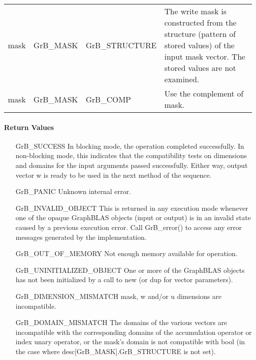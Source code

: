 \begin{itemize}[leftmargin=1.1in]
\begin{tabular}{lllp{2.7in}}
        {\sf mask} & {\sf GrB\_MASK} & {\sf GrB\_STRUCTURE}   & The write mask is
        constructed from the structure (pattern of stored values) of the input
        {\sf mask} vector. The stored values are not examined.\\

        {\sf mask} & {\sf GrB\_MASK} & {\sf GrB\_COMP}   & Use the 
        complement of {\sf mask}. \\
    \end{tabular}
\end{itemize}

\paragraph{Return Values}

\begin{itemize}[leftmargin=2.2in]
    \item[{\sf GrB\_SUCCESS}]         In blocking mode, the operation completed
    successfully. In non-blocking mode, this indicates that the compatibility 
    tests on dimensions and domains for the input arguments passed successfully. 
    Either way, output vector {\sf w} is ready to be used in the next method of 
    the sequence.

    \item[{\sf GrB\_PANIC}]           Unknown internal error.

    \item[{\sf GrB\_INVALID\_OBJECT}] This is returned in any execution mode 
    whenever one of the opaque GraphBLAS objects (input or output) is in an invalid 
    state caused by a previous execution error.  Call {\sf GrB\_error()} to access 
    any error messages generated by the implementation.

    \item[{\sf GrB\_OUT\_OF\_MEMORY}] Not enough memory available for operation.

    \item[{\sf GrB\_UNINITIALIZED\_OBJECT}] One or more of the GraphBLAS objects
    has not been initialized by a call to {\sf new} (or {\sf dup} for vector
    parameters).

    \item[{\sf GrB\_DIMENSION\_MISMATCH}]  {\sf mask}, {\sf w} and/or {\sf u}
    dimensions are incompatible.

    \item[{\sf GrB\_DOMAIN\_MISMATCH}]    The domains of the various vectors are
    incompatible with the corresponding domains of the accumulation operator
    or index unary operator, or the mask's domain is not compatible with {\sf bool}
    (in the case where {\sf desc[GrB\_MASK].GrB\_STRUCTURE} is not set).
\end{itemize}

